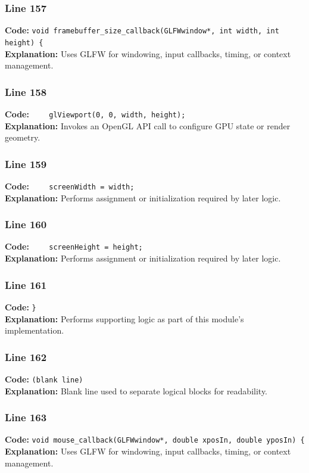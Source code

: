 \documentclass[11pt,a4paper]{article}
\begin{document}
\subsubsection*{Line 157}
\textbf{Code:} \verb|void framebuffer_size_callback(GLFWwindow*, int width, int height) {|\\
\textbf{Explanation:} Uses GLFW for windowing, input callbacks, timing, or context management.

\subsubsection*{Line 158}
\textbf{Code:} \verb|    glViewport(0, 0, width, height);|\\
\textbf{Explanation:} Invokes an OpenGL API call to configure GPU state or render geometry.

\subsubsection*{Line 159}
\textbf{Code:} \verb|    screenWidth = width;|\\
\textbf{Explanation:} Performs assignment or initialization required by later logic.

\subsubsection*{Line 160}
\textbf{Code:} \verb|    screenHeight = height;|\\
\textbf{Explanation:} Performs assignment or initialization required by later logic.

\subsubsection*{Line 161}
\textbf{Code:} \verb|}|\\
\textbf{Explanation:} Performs supporting logic as part of this module's implementation.

\subsubsection*{Line 162}
\textbf{Code:} \texttt{(blank line)}\\
\textbf{Explanation:} Blank line used to separate logical blocks for readability.

\subsubsection*{Line 163}
\textbf{Code:} \verb|void mouse_callback(GLFWwindow*, double xposIn, double yposIn) {|\\
\textbf{Explanation:} Uses GLFW for windowing, input callbacks, timing, or context management.
\end{document}
